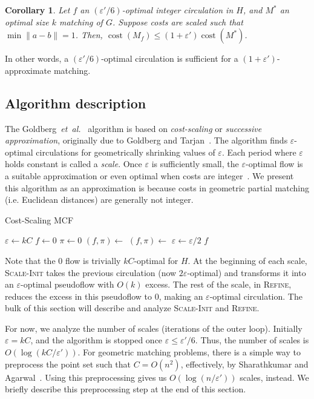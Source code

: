 \documentclass[11pt]{article}
\def\etal{\textsl{et~al.}}
\def\eps{\varepsilon}
\theoremstyle{plain}
\newtheorem{corollary}[lemma]{Corollary}
\numberwithin{figure}{section}
\def\cost{\operatorname{cost}}
\begin{document}
\begin{corollary}
\label{corollary:match_approx}
Let $f$ an $(\eps'/6)$-optimal integer circulation in $H$, and $M^*$ an optimal
size $k$ matching of $G$.
Suppose costs are scaled such that $\min \|a - b\| = 1$.
Then, $\cost(M_f) \leq (1 + \eps') \cost(M^*)$.
\end{corollary}

In other words, a $(\eps'/6)$-optimal circulation is sufficient for a
$(1 + \eps')$-approximate matching.

\subsection{Algorithm description}

The Goldberg~{\etal}~\cite{GHKT17} algorithm is based on \emph{cost-scaling} or
\emph{successive approximation}, originally due to Goldberg and
Tarjan~\cite{GT90}.
The algorithm finds $\eps$-optimal circulations for geometrically shrinking
values of $\eps$.
Each period where $\eps$ holds constant is called a \emph{scale}.
Once $\eps$ is sufficiently small, the $\eps$-optimal flow is a suitable
approximation or even optimal when costs are integer~\cite{GT90,GHKT17}.
We present this algorithm as an approximation is because costs in geometric
partial matching (i.e. Euclidean distances) are generally not integer.

\begin{algorithm}
\caption{Cost-Scaling MCF}
\begin{algorithmic}[1]
\Function{MCF}{$H$, $\eps'$}
	\State $\eps \gets kC$
	\State $f \gets 0$
	\State $\pi \gets 0$
	\Repeat
		\State $(f, \pi) \gets$ 
		\State $(f, \pi) \gets$ 
		\State $\eps \gets \eps/2$
	\Until{$\eps \leq \eps'/6$}
	\State\Return $f$
\EndFunction
\end{algorithmic}
\end{algorithm}

Note that the 0 flow is trivially $kC$-optimal for $H$.
At the beginning of each scale, \textsc{Scale-Init} takes the previous
circulation (now $2\eps$-optimal) and transforms it into an $\eps$-optimal
pseudoflow with $O(k)$ excess.
The rest of the scale, in \textsc{Refine}, reduces the excess in this
pseudoflow to 0, making an $\eps$-optimal circulation.
The bulk of this section will describe and analyze \textsc{Scale-Init} and
\textsc{Refine}.

For now, we analyze the number of scales (iterations of the outer loop).
Initially $\eps = kC$, and the algorithm is stopped once $\eps \leq \eps'/6$.
Thus, the number of scales is $O(\log(kC/\eps'))$.
For geometric matching problems, there is a simple way to preprocess the point
set such that $C = O(n^2)$, effectively, by Sharathkumar and Agarwal~\cite{SA12}.
Using this preprocessing gives us $O(\log(n/\eps'))$ scales, instead.
We briefly describe this preprocessing step at the end of this section.
\end{document}
